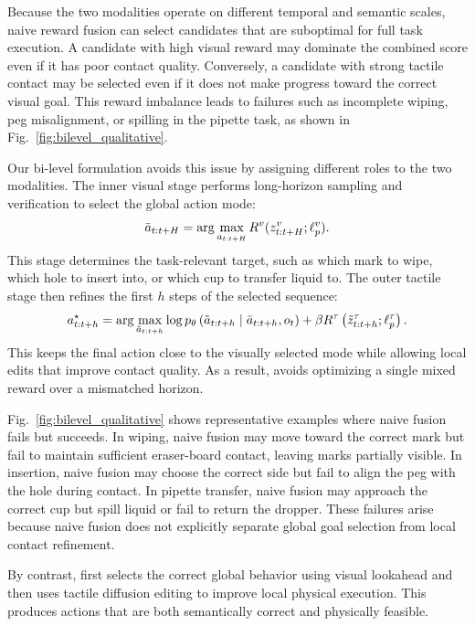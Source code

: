 Because the two modalities operate on different temporal and semantic scales, naive reward fusion can select candidates that are suboptimal for full task execution. A candidate with high visual reward may dominate the combined score even if it has poor contact quality. Conversely, a candidate with strong tactile contact may be selected even if it does not make progress toward the correct visual goal. This reward imbalance leads to failures such as incomplete wiping, peg misalignment, or spilling in the pipette task, as shown in Fig.~\ref{fig:bilevel_qualitative}.

Our bi-level formulation avoids this issue by assigning different roles to the two modalities. The inner visual stage performs long-horizon sampling and verification to select the global action mode:
\[
\bar{a}_{t:t+H}
=
\arg\max_{a_{t:t+H}}
R^v(z^{v}_{t:t+H}; \ell_p^v).
\]
This stage determines the task-relevant target, such as which mark to wipe, which hole to insert into, or which cup to transfer liquid to. The outer tactile stage then refines the first $h$ steps of the selected sequence:
\[
a^\star_{t:t+h}
=
\arg\max_{\tilde{a}_{t:t+h}}
\log p_\theta
\left(
    \tilde{a}_{t:t+h}
    \mid
    \bar{a}_{t:t+h}, o_t
\right)
+
\beta R^\tau
\left(
    \tilde{z}^{\tau}_{t:t+h};
    \ell_p^\tau
\right).
\]
This keeps the final action close to the visually selected mode while allowing local edits that improve contact quality. As a result, \ours{} avoids optimizing a single mixed reward over a mismatched horizon.

Fig.~\ref{fig:bilevel_qualitative} shows representative examples where naive fusion fails but \ours{} succeeds. In wiping, naive fusion may move toward the correct mark but fail to maintain sufficient eraser-board contact, leaving marks partially visible. In insertion, naive fusion may choose the correct side but fail to align the peg with the hole during contact. In pipette transfer, naive fusion may approach the correct cup but spill liquid or fail to return the dropper. These failures arise because naive fusion does not explicitly separate global goal selection from local contact refinement.

By contrast, \ours{} first selects the correct global behavior using visual lookahead and then uses tactile diffusion editing to improve local physical execution. This produces actions that are both semantically correct and physically feasible.

